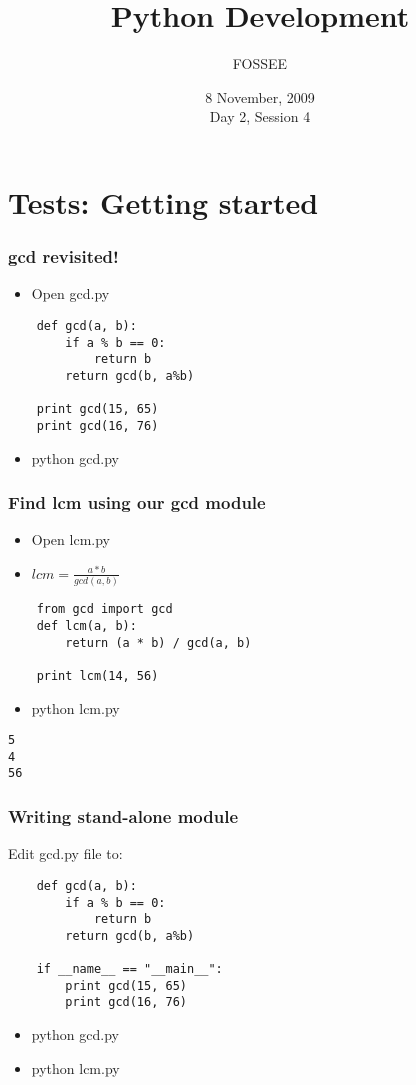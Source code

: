 \documentclass[compress,14pt]{beamer}
\title[Python Development]{Python Development}
\author[FOSSEE] {FOSSEE}
\institute[IIT Bombay] {Department of Aerospace Engineering\\IIT Bombay}
\date[] {8 November, 2009\\Day 2, Session 4}
\begin{document}
\begin{frame}
  \maketitle
\end{frame}

\section{Tests: Getting started}
\begin{frame}[fragile] 
  \frametitle{gcd revisited!}
  \begin{itemize}
  \item Open gcd.py
  \end{itemize}  
\begin{lstlisting}
    def gcd(a, b):
        if a % b == 0: 
            return b
        return gcd(b, a%b)

    print gcd(15, 65)
    print gcd(16, 76)
\end{lstlisting}
  \begin{itemize}
  \item python gcd.py
  \end{itemize}
\end{frame}

\begin{frame}[fragile] 
  \frametitle{Find lcm using our gcd module}
  \begin{itemize}
  \item Open lcm.py  
  \item $lcm = \frac{a*b}{gcd(a,b)}$
  \end{itemize}  
\begin{lstlisting}
    from gcd import gcd    
    def lcm(a, b):
        return (a * b) / gcd(a, b)
    
    print lcm(14, 56)
\end{lstlisting}
  \begin{itemize}
  \item python lcm.py
  \end{itemize}
  \begin{lstlisting}
5
4
56
  \end{lstlisting}    
\end{frame}

\begin{frame}[fragile] 
  \frametitle{Writing stand-alone module}  
Edit gcd.py file to:
\begin{lstlisting}
    def gcd(a, b):
        if a % b == 0: 
            return b
        return gcd(b, a%b)

    if __name__ == "__main__":        
        print gcd(15, 65)
        print gcd(16, 76)
\end{lstlisting}
  \begin{itemize}
  \item python gcd.py
  \item python lcm.py
  \end{itemize}
\end{frame}
\end{document}
